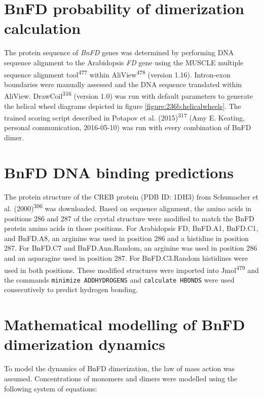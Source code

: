 \documentclass[12pt,]{book}
\begin{document}
\section{BnFD probability of dimerization
calculation}\label{bnfd-probability-of-dimerization-calculation}

The protein sequence of \emph{BnFD} genes was determined by performing
DNA sequence alignment to the Arabidopsis \emph{FD} gene using the
MUSCLE multiple sequence alignment tool\textsuperscript{477} within
AliView\textsuperscript{478} (version 1.16). Intron-exon boundaries were
manually assessed and the DNA sequence translated within AliView.
DrawCoil\textsuperscript{316} (version 1.0) was run with default
parameters to generate the helical wheel diagrams depicted in figure
\ref{figure:236b:helicalwheels}. The trained scoring script described in
Potapov et al. (2015)\textsuperscript{317} (Amy E. Keating, personal
communication, 2016-05-10) was run with every combination of BnFD dimer.

\section{BnFD DNA binding predictions}\label{sections:methods:fdbinding}

The protein structure of the CREB protein (PDB ID: 1DH3) from Schumacher
et al. (2000)\textsuperscript{306} was downloaded. Based on sequence
alignment, the amino acids in positions 286 and 287 of the crystal
structure were modified to match the BnFD protein amino acids in those
positions. For Arabidopsis FD, BnFD.A1, BnFD.C1, and BnFD.A8, an
arginine was used in position 286 and a histidine in position 287. For
BnFD.C7 and BnFD.Ann.Random, an arginine was used in position 286 and an
asparagine used in position 287. For BnFD.C3.Random histidines were used
in both positions. These modified structures were imported into
Jmol\textsuperscript{479} and the commands
\texttt{minimize\ ADDHYDROGENS} and \texttt{calculate\ HBONDS} were used
consecutively to predict hydrogen bonding.

\section{Mathematical modelling of BnFD dimerization
dynamics}\label{sections:methods:fdmodelling}

To model the dynamics of BnFD dimerization, the law of mass action was
assumed. Concentrations of monomers and dimers were modelled using the
following system of equations:
\end{document}
